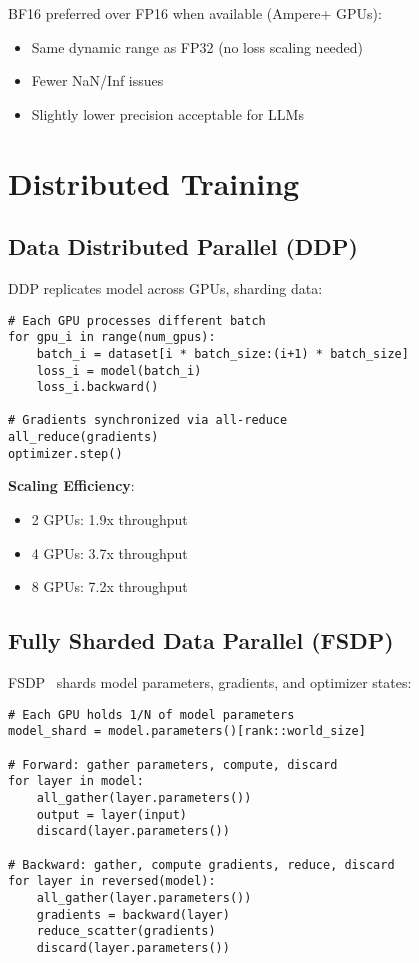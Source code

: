 \documentclass[11pt,letterpaper]{article}
\begin{document}
BF16 preferred over FP16 when available (Ampere+ GPUs):
\begin{itemize}
\item Same dynamic range as FP32 (no loss scaling needed)
\item Fewer NaN/Inf issues
\item Slightly lower precision acceptable for LLMs
\end{itemize}

\section{Distributed Training}

\subsection{Data Distributed Parallel (DDP)}

DDP replicates model across GPUs, sharding data:

\begin{verbatim}
# Each GPU processes different batch
for gpu_i in range(num_gpus):
    batch_i = dataset[i * batch_size:(i+1) * batch_size]
    loss_i = model(batch_i)
    loss_i.backward()

# Gradients synchronized via all-reduce
all_reduce(gradients)
optimizer.step()
\end{verbatim}

\textbf{Scaling Efficiency}:
\begin{itemize}
\item 2 GPUs: 1.9x throughput
\item 4 GPUs: 3.7x throughput
\item 8 GPUs: 7.2x throughput
\end{itemize}

\subsection{Fully Sharded Data Parallel (FSDP)}

FSDP~\citep{zhao2023pytorch} shards model parameters, gradients, and optimizer states:

\begin{verbatim}
# Each GPU holds 1/N of model parameters
model_shard = model.parameters()[rank::world_size]

# Forward: gather parameters, compute, discard
for layer in model:
    all_gather(layer.parameters())
    output = layer(input)
    discard(layer.parameters())

# Backward: gather, compute gradients, reduce, discard
for layer in reversed(model):
    all_gather(layer.parameters())
    gradients = backward(layer)
    reduce_scatter(gradients)
    discard(layer.parameters())
\end{verbatim}
\end{document}
